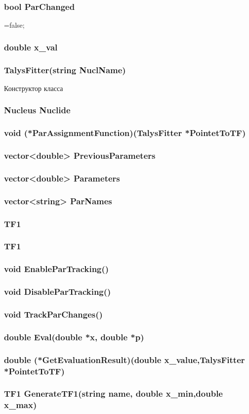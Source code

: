 \documentclass[a4paper,12pt]{extarticle}
\begin{document}
\subsubsection{bool ParChanged}
=false;
\subsubsection{double x_val}

\subsubsection{TalysFitter(string NuclName)}
Конструктор класса
\subsubsection{Nucleus Nuclide}

\subsubsection{void (*ParAssignmentFunction)(TalysFitter *PointetToTF)}
\subsubsection{vector<double> PreviousParameters}
\subsubsection{vector<double> Parameters}
\subsubsection{vector<string> ParNames}
\subsubsection{TF1}
\subsubsection{TF1}
\subsubsection{void EnableParTracking()}
\subsubsection{void DisableParTracking()}
\subsubsection{void TrackParChanges()}
\subsubsection{double Eval(double *x, double *p)}
\subsubsection{double (*GetEvaluationResult)(double x_value,TalysFitter *PointetToTF)}
\subsubsection{TF1 GenerateTF1(string name, double x_min,double x_max)}
\end{document}
